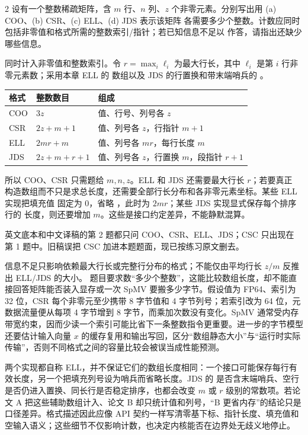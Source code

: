\begin{solutionexercise}{2}
\problemheading 设有一个整数稀疏矩阵，含 $m$ 行、$n$ 列、$z$ 个非零元素。分别写出用
\textup{(a)} COO、\textup{(b)} CSR、\textup{(c)} ELL、\textup{(d)} JDS 表示该矩阵
各需要多少个整数。计数应同时包括非零值和格式所需的整数索引/指针；若已知信息不足以
作答，请指出还缺少哪些信息。

\approachheading 同时计入非零值和整数索引。令
$r=\max_i\ell_i$ 为最大行长，其中 $\ell_i$ 是第 $i$ 行非零元素数；采用本章 ELL 的
 数组以及 JDS 的行置换和带末端哨兵的 。

\answerheading
\begin{center}
\begin{tabular}{lll}
\toprule
格式 & 整数数目 & 组成\\
\midrule
COO & $3z$ & 值、行号、列号各 $z$\\
CSR & $2z+m+1$ & 值、列号各 $z$，行指针 $m+1$\\
ELL & $2mr+m$ & 值、列号各 $mr$，每行长度 $m$\\
JDS & $2z+m+r+1$ & 值、列号各 $z$，行置换 $m$，段指针 $r+1$\\
\bottomrule
\end{tabular}
\end{center}
所以 COO、CSR 只需题给 $m,n,z$。ELL 和 JDS 还需要最大行长 $r$；若要真正
构造数组而不只是求总长度，还需要全部行长分布和各非零元素坐标。某些 ELL 实现把填充值
固定为 0，省略 ，此时为 $2mr$；某些 JDS 实现显式保存每个排序行的
长度，则还要增加 $m$。这些是接口约定差异，不能静默混算。

\editorialnote 英文底本和中文译稿的第 2 题都只问 COO、CSR、ELL、JDS；CSC 只出现在
第 1 题中。旧稿误把 CSC 加进本题题面，现已按练习原文删去。

\conclusionheading 信息不足只影响依赖最大行长或完整行分布的格式；不能仅由平均行长
$z/m$ 反推出 ELL/JDS 的大小。
\discussionheading
{}
题目要求数“多少个整数”，这能比较数组长度，却不能直接回答矩阵能否装入显存或一次 SpMV 要搬多少字节。假设值为 FP64、索引为 32 位，CSR 每个非零元至少携带 8 字节值和 4 字节列号；若索引改为 64 位，元数据流量便从每项 4 字节增到 8 字节，而乘加次数没有变化。SpMV 通常受内存带宽约束，因而少读一个索引可能比省下一条整数指令更重要。进一步的字节模型还要估计输入向量 $x$ 的缓存复用和输出写回，区分“数组静态大小”与“运行时实际传输”，否则不同格式之间的容量比较会被误当成性能预测。

两个实现都自称 ELL，并不保证它们的数组长度相同：一个接口可能保存每行有效长度，另一个把填充列号设为哨兵而省略长度。JDS 的  是否含末端哨兵、空行是否仍进入置换、同长行是否稳定排序，也都会改变 $m$ 或 $r$ 级别的常数项。若论文 A 把这些辅助数组计入、论文 B 却只统计值和列号，“B 更省内存”的结论只是口径差异。格式描述因此应像 API 契约一样写清零基下标、指针长度、填充值和空输入语义；这些细节不仅影响计数，也决定内核能否在边界处无歧义地停止。


\end{solutionexercise}
